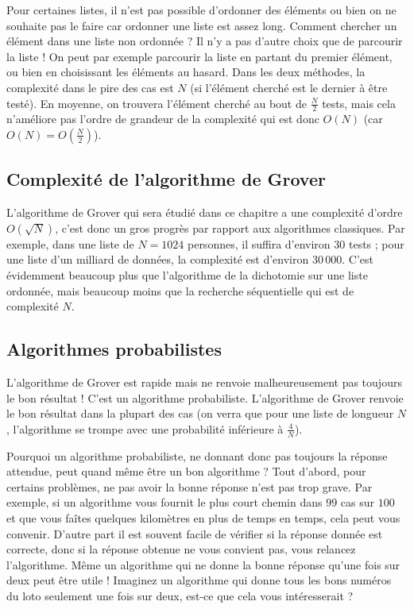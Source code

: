 \documentclass[11pt,class=report,crop=false]{standalone}
\begin{document}
Pour certaines listes, il n'est pas possible d'ordonner des éléments ou bien on ne souhaite pas le faire car ordonner une liste est assez long.
Comment chercher un élément dans une liste non ordonnée ?
Il n'y a pas d'autre choix que de parcourir la liste ! On peut par exemple parcourir la liste en partant du premier élément, ou bien en choisissant les éléments au hasard.
Dans les deux méthodes, la complexité dans le pire des cas est $N$ (si l'élément cherché est le dernier à être testé). En moyenne, on trouvera l'élément cherché au bout de $\frac{N}{2}$ tests, mais cela n'améliore pas l'ordre de grandeur de la complexité qui est donc $O(N)$ (car $O(N)=O(\frac{N}{2})$).


\subsection{Complexité de l'algorithme de Grover}

L'algorithme de Grover qui sera étudié dans ce chapitre a une complexité d'ordre $O(\sqrt{N})$, c'est donc un gros progrès par rapport aux algorithmes classiques.
Par exemple, dans une liste de $N=1024$ personnes, il suffira d'environ $30$ tests ; 
pour une liste d'un milliard de données, la complexité est d'environ $30\,000$. C'est évidemment beaucoup plus que l'algorithme de la dichotomie sur une liste ordonnée, mais beaucoup moins que la recherche séquentielle qui est de complexité $N$.

\subsection{Algorithmes probabilistes}


L'algorithme de Grover est rapide mais ne renvoie malheureusement pas toujours le bon résultat !
C'est un algorithme probabiliste. L'algorithme de Grover renvoie le bon résultat dans la plupart des cas (on verra que pour une liste de longueur $N$, l'algorithme se trompe avec une probabilité inférieure à $\frac4N$). 

Pourquoi un algorithme probabiliste, ne donnant donc pas toujours la réponse attendue, peut quand même être un bon algorithme ?
Tout d'abord, pour certains problèmes, ne pas avoir la bonne réponse n'est pas trop grave. Par exemple, si un algorithme vous fournit le plus court chemin dans $99$ cas sur $100$ et que vous faîtes quelques kilomètres en plus de temps en temps, cela peut vous convenir. D'autre part il est souvent facile de vérifier si la réponse donnée est correcte, donc si la réponse obtenue ne vous convient pas, vous relancez l'algorithme.
Même un algorithme qui ne donne la bonne réponse qu'une fois sur deux peut être utile ! Imaginez un algorithme qui donne tous les bons numéros du loto seulement une fois sur deux, est-ce que cela vous intéresserait ?
\end{document}
